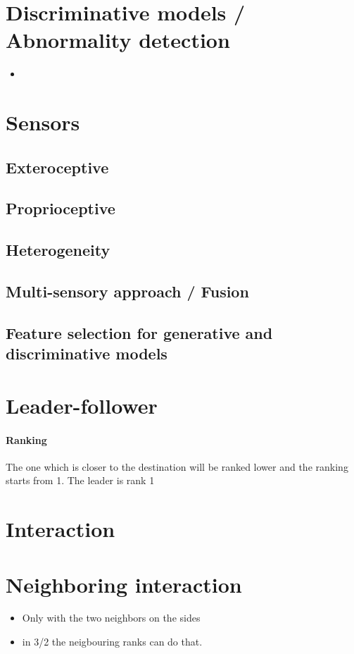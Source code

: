 \documentclass{article}
\begin{document}
	\section{Discriminative models / Abnormality detection }
		\begin{itemize}
			\item 
		\end{itemize}
	
	\section{Sensors}
		\subsection{Exteroceptive}
		\subsection{Proprioceptive}
		\subsection{Heterogeneity}
		\subsection{Multi-sensory approach / Fusion}
		\subsection{Feature selection for generative and discriminative models}
	
	\section{Leader-follower}
		\paragraph{Ranking}
		The one which is closer to the destination will be ranked lower and the ranking starts from 1. The leader is rank 1
	
	\section{Interaction}
		\section{Neighboring interaction}
			\begin{itemize}
				\item Only with the two neighbors on the sides
				\item in 3/2 the neigbouring ranks can do that.
			\end{itemize}
\end{document}
